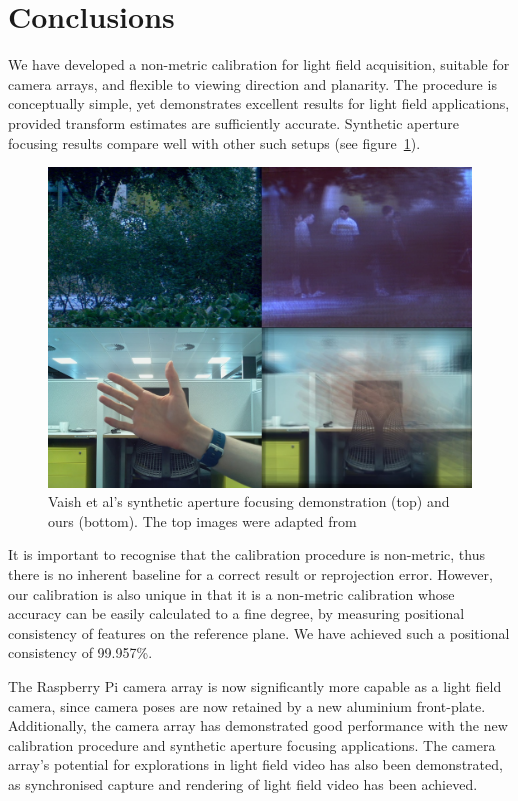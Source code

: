\documentclass[../main.tex]{subfiles}
\begin{document}
\section{Conclusions} \label{sec:conclusions}
We have developed a non-metric calibration for light field acquisition, suitable for camera arrays, and flexible to viewing direction and planarity. The procedure is conceptually simple, yet demonstrates excellent results for light field applications, provided transform estimates are sufficiently accurate. Synthetic aperture focusing results compare well with other such setups (see figure~\ref{fig:occlusion-robustness-comparison}).

\begin{figure}[H]
    \centering
    \includegraphics[width=\linewidth]{images/occlusion-robustness-comparison}
    \caption{Vaish et al's synthetic aperture focusing demonstration (top) and ours (bottom). The top images were adapted from \protect{}}
    \label{fig:occlusion-robustness-comparison}
\end{figure}
\newpage

It is important to recognise that the calibration procedure is non-metric, thus there is no inherent baseline for a correct result or reprojection error. However, our calibration is also unique in that it is a non-metric calibration whose accuracy can be easily calculated to a fine degree, by measuring positional consistency of features on the reference plane. We have achieved such a positional consistency of 99.957\%.

The Raspberry Pi camera array is now significantly more capable as a light field camera, since camera poses are now retained by a new aluminium front-plate. Additionally, the camera array has demonstrated good performance with the new calibration procedure and synthetic aperture focusing applications. The camera array's potential for explorations in light field video has also been demonstrated, as synchronised capture and rendering of light field video has been achieved.
\end{document}
